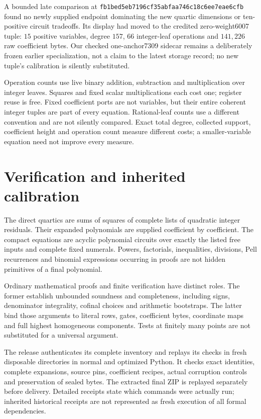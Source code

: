 \documentclass[11pt]{article}
\theoremstyle{definition}\newtheorem{definition}[theorem]{Definition}
\theoremstyle{remark}\newtheorem{remark}[theorem]{Remark}
\begin{document}
A bounded late comparison at
\texttt{fb1bed5eb7196cf35abfaa746c18c6ee7eae6cfb} found no newly supplied
endpoint dominating the new quartic dimensions or ten-positive circuit
tradeoffs. Its display had moved to the credited zero-weight6007 tuple:
$15$ positive variables, degree $157$, $66$ integer-leaf operations and
$141{,}226$ raw coefficient bytes. Our checked one-anchor7309 sidecar
remains a deliberately frozen earlier specialization, not a claim to the
latest storage record; no new tuple's calibration is silently substituted.

Operation counts use live binary addition, subtraction and multiplication
over integer leaves. Squares and fixed scalar multiplications each cost one;
register reuse is free. Fixed coefficient ports are not variables, but their
entire coherent integer tuples are part of every equation. Rational-leaf
counts use a different convention and are not silently compared. Exact total
degree, collected support, coefficient height and operation count measure
different costs; a smaller-variable equation need not improve every measure.






\section{Verification and inherited calibration}
The direct quartics are sums of squares of complete lists of quadratic
integer residuals. Their expanded polynomials are supplied coefficient by
coefficient. The compact equations are acyclic polynomial circuits over
exactly the listed free inputs and complete fixed numerals. Powers,
factorials, inequalities, divisions, Pell recurrences and binomial
expressions occurring in proofs are not hidden primitives of a final
polynomial.

Ordinary mathematical proofs and finite verification have distinct roles.
The former establish unbounded soundness and completeness, including
signs, denominator integrality, cofinal choices and arithmetic bootstraps.
The latter bind those arguments to literal rows, gates, coefficient bytes,
coordinate maps and full highest homogeneous components. Tests at finitely
many points are not substituted for a universal argument.

The release authenticates its complete inventory and replays its checks in
fresh disposable directories in normal and optimized Python. It checks
exact identities, complete expansions, source pins, coefficient recipes,
actual corruption controls and preservation of sealed bytes. The extracted
final ZIP is replayed separately before delivery. Detailed receipts state
which commands were actually run; inherited historical receipts are not
represented as fresh execution of all formal dependencies.
\end{document}
